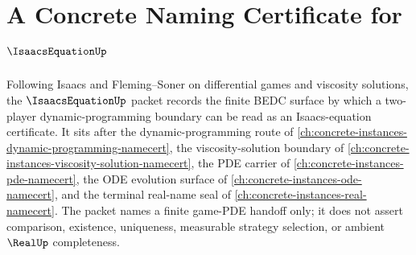 \chapter{A Concrete Naming Certificate for $\IsaacsEquationUp$}
\label{ch:concrete-instances-isaacs-equation-namecert}

Following Isaacs and Fleming--Soner on differential games and viscosity solutions, the $\IsaacsEquationUp$ packet records the finite BEDC surface by which a two-player dynamic-programming boundary can be read as an Isaacs-equation certificate. It sits after the dynamic-programming route of \autoref{ch:concrete-instances-dynamic-programming-namecert}, the viscosity-solution boundary of \autoref{ch:concrete-instances-viscosity-solution-namecert}, the PDE carrier of \autoref{ch:concrete-instances-pde-namecert}, the ODE evolution surface of \autoref{ch:concrete-instances-ode-namecert}, and the terminal real-name seal of \autoref{ch:concrete-instances-real-namecert}. The packet names a finite game-PDE handoff only; it does not assert comparison, existence, uniqueness, measurable strategy selection, or ambient $\RealUp$ completeness.

